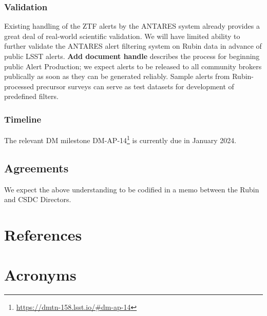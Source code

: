 \documentclass[DM,authoryear,toc]{lsstdoc}
\begin{document}
\subsubsection{Validation}

Existing handling of the ZTF alerts by the ANTARES system already provides a great deal of real-world scientific validation.
We will have limited ability to further validate the ANTARES alert filtering system on Rubin data in advance of public LSST alerts.
\textbf{Add document handle} describes the process for beginning public Alert Production; we expect alerts to be released to all community brokers publically as soon as they can be generated reliably.
Sample alerts from Rubin-processed precursor surveys can serve as test datasets for development of predefined filters.


\subsubsection{Timeline}

The relevant DM milestone DM-AP-14\footnote{\url{https://dmtn-158.lsst.io/\#dm-ap-14}} is currently due in January 2024.
\subsection{Agreements}

We expect the above understanding to be codified in a memo between the Rubin and CSDC Directors.

\appendix
\section{References} \label{sec:bib}
\renewcommand{\refname}{} %


\section{Acronyms} \label{sec:acronyms}

\end{document}
